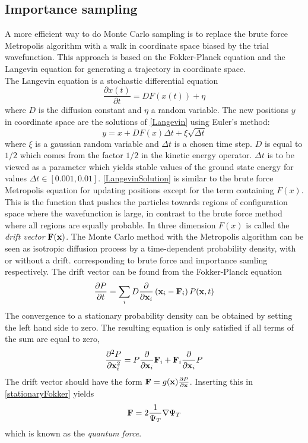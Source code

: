 \documentclass[english, a4paper]{article}
\begin{document}
\subsection{Importance sampling}

A more efficient way to do Monte Carlo sampling is to replace the brute force Metropolis algorithm
with a walk in coordinate space biased by the trial wavefunction. This approach is based on the 
Fokker-Planck equation and the Langevin equation for generating a trajectory in coordinate space. \\

\noindent The Langevin equation is a stochastic differential equation
\begin{equation}
 \frac{\partial x(t)}{\partial t} = D F(x(t)) + \eta
 \label{Langevin}
\end{equation}
where $D$ is the diffusion constant and $\eta$ a random variable.
The new positions $y$ in coordinate space are the solutions of \eqref{Langevin} using Euler's method:
\begin{equation}
 y = x + DF(x)\Delta t + \xi \sqrt{\Delta t}
 \label{LangevinSolution}
\end{equation}
where $\xi$ is a gaussian random variable and $\Delta t$ is a chosen time step. $D$ is equal to $1/2$
which comes from the factor $1/2$ in the kinetic energy operator. $\Delta t$ is to be viewed as a
parameter which yields stable values of the ground state energy for values $\Delta t \in [0.001, 0.01]$.
\eqref{LangevinSolution} is similar to the brute force Metropolis equation for updating positions except for the
term  containing $F(x)$. This is the function that pushes the particles towards regions of configuration space
where the wavefunction is large, in contrast to the brute force method where all regions are equally probable. 
In three dimension $F(x)$ is called the \textit{drift vector} ${\bf F}({\bf x})$.
The Monte Carlo method with the Metropolis algorithm can be seen as isotropic diffusion process by a time-dependent 
probability density, with or without a drift. corresponding to brute force and importance samling respectively.
The drift vector can be found from the
Fokker-Planck equation
\begin{equation}
 \frac{\partial P}{\partial t} = \sum_i D \frac{\partial}{\partial {\bf x}_i}
 \left( {\bf x}_i - {\bf F}_i \right) P({\bf x}, t)
\end{equation}
The convergence to a stationary probability density can be obtained by setting the left hand side to zero. 
The resulting equation is only satisfied if all terms of the sum are equal to zero, 
\begin{equation}
 \frac{\partial^2 P}{\partial {\bf x}_i^2} = P \frac{\partial}{\partial {\bf x}_i} {\bf F}_i
 + {\bf F}_i \frac{\partial}{\partial {\bf x}_i} P
 \label{stationaryFokker}
\end{equation}
The drift vector should have the form ${\bf F} = g({\bf x}) \frac{\partial P}{\partial {\bf x}}$. Inserting this in
\eqref{stationaryFokker} yields 
\begin{equation}
 {\bf F} = 2 \frac{1}{\Psi_T} \nabla \Psi_T
\end{equation}
which is known as the \textit{quantum force}. \\
\end{document}
